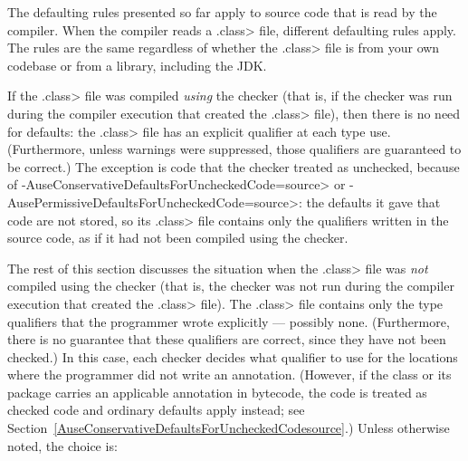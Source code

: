 
The defaulting rules presented so far apply to source code that is read by
the compiler.  When the compiler reads a \<.class> file, different
defaulting rules apply.  The rules are the same regardless of whether the
\<.class> file is from your own codebase or from a library, including the
JDK\@.

If the \<.class> file was compiled \emph{using} the checker (that is,
if the checker was run during the compiler execution that created
the \<.class> file),
then there is no need for
defaults:  the \<.class> file has an explicit qualifier at each type use.
(Furthermore, unless warnings were suppressed, those qualifiers are
guaranteed to be correct.)
The exception is code that the checker treated as unchecked, because of
\<-AuseConservativeDefaultsForUncheckedCode=source> or
\<-AusePermissiveDefaultsForUncheckedCode=source>:  the defaults it gave that
code are not stored, so its \<.class> file contains only the qualifiers
written in the source code, as if it had not been compiled using the checker.

The rest of this section discusses the situation when the \<.class> file
was \emph{not} compiled using the checker (that is, the checker was not run
during the compiler execution that created the \<.class> file).
The \<.class> file contains only the type qualifiers
that the programmer wrote explicitly --- possibly none.
(Furthermore, there is no guarantee
that these qualifiers are correct, since they have not been checked.)
In this case, each checker decides what qualifier to use for the
locations where the programmer did not write an annotation.  (However, if the
class or its package carries an applicable
 annotation in bytecode, the code is
treated as checked code and ordinary defaults apply instead; see
Section~\ref{AuseConservativeDefaultsForUncheckedCodesource}.)  Unless otherwise
noted, the choice is:

